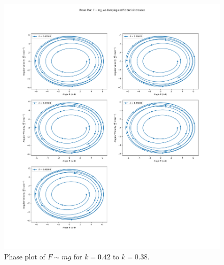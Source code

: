 \documentclass[10pt, twocolumn]{article}
\begin{document}
\begin{figure}[H]
    \centering
    \includegraphics[width = \columnwidth]{Projects/ForcedSimplePendulum/Plots/Phase plot of F~mg as damping coefficient k increases from 0.42 to 0.38.png}
    \caption{Phase plot of $F \sim{mg}$ for $k = 0.42$ to $k = 0.38$.}
    \label{phase plot of k 0.42 to 0.38}
\end{figure}
\end{document}
